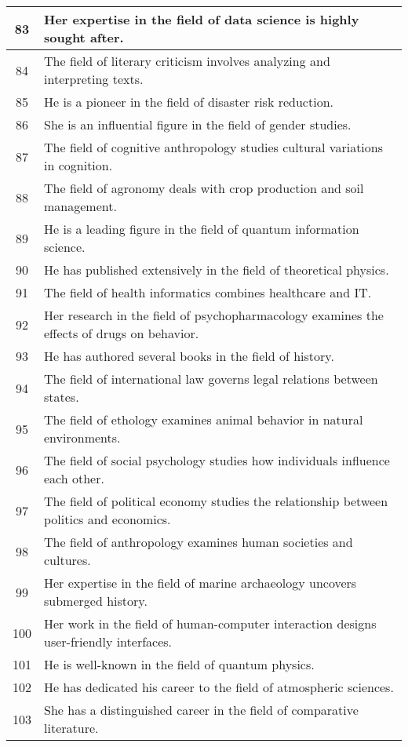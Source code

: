 \begin{longtable}{|c|p{12cm}|}
83 & Her expertise in the field of data science is highly sought after. \\ \hline
84 & The field of literary criticism involves analyzing and interpreting texts. \\ \hline
85 & He is a pioneer in the field of disaster risk reduction. \\ \hline
86 & She is an influential figure in the field of gender studies. \\ \hline
87 & The field of cognitive anthropology studies cultural variations in cognition. \\ \hline
88 & The field of agronomy deals with crop production and soil management. \\ \hline
89 & He is a leading figure in the field of quantum information science. \\ \hline
90 & He has published extensively in the field of theoretical physics. \\ \hline
91 & The field of health informatics combines healthcare and IT. \\ \hline
92 & Her research in the field of psychopharmacology examines the effects of drugs on behavior. \\ \hline
93 & He has authored several books in the field of history. \\ \hline
94 & The field of international law governs legal relations between states. \\ \hline
95 & The field of ethology examines animal behavior in natural environments. \\ \hline
96 & The field of social psychology studies how individuals influence each other. \\ \hline
97 & The field of political economy studies the relationship between politics and economics. \\ \hline
98 & The field of anthropology examines human societies and cultures. \\ \hline
99 & Her expertise in the field of marine archaeology uncovers submerged history. \\ \hline
100 & Her work in the field of human-computer interaction designs user-friendly interfaces. \\ \hline
101 & He is well-known in the field of quantum physics. \\ \hline
102 & He has dedicated his career to the field of atmospheric sciences. \\ \hline
103 & She has a distinguished career in the field of comparative literature. \\ \hline

\end{longtable}
